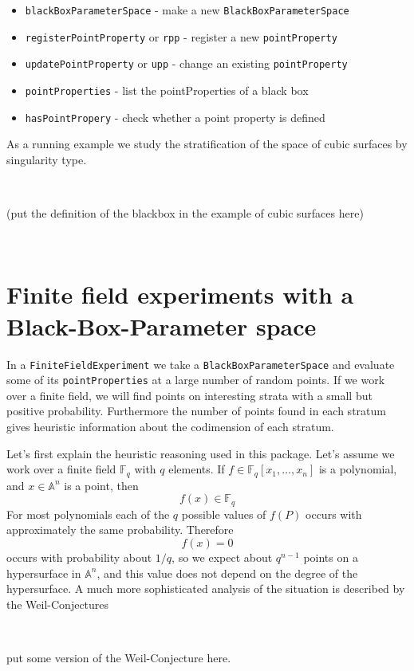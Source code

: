 \documentclass[12pt,a4paper]{amsart}
\theoremstyle{plain}
\theoremstyle{definition}
\newcommand{\FF}{\mathbb F}
\renewcommand{\AA}{\mathbb A}
\begin{document}
\begin{itemize}
\item {\tt blackBoxParameterSpace} - make a new {\tt BlackBoxParameterSpace}
\item {\tt registerPointProperty} or {\tt rpp} - register a new {\tt pointProperty}
\item {\tt updatePointProperty} or {\tt upp} - change an existing {\tt pointProperty}
\item {\tt pointProperties} - list the pointProperties of a black box
\item {\tt hasPointPropery} - check whether a point property is defined
\end{itemize}

As a running example we study the stratification of the space of cubic surfaces by singularity type. 

\

{\color{red} (put the definition of the blackbox in the example of cubic surfaces here)}

\

\section{Finite field experiments with a Black-Box-Parameter space}

In a {\tt FiniteFieldExperiment} we take a {\tt BlackBoxParameterSpace} and evaluate some of its {\tt pointProperties} at a large number of random points. If we work over a finite field, we will find points on interesting strata with a small but positive probability. Furthermore the number of points found in each stratum gives heuristic information about the codimension of each stratum.

Let's first explain the heuristic reasoning used in this package. Let's assume we work over a finite field $\FF_q$ with $q$ elements. If $f \in \FF_q[x_1,\dots,x_n]$ is a polynomial, and $x \in \AA^n$ is a point, then
\[
	f(x) \in \FF_q
\]
For most polynomials each of the $q$ possible values of $f(P)$ occurs with approximately the same probability. Therefore 
\[
	f(x) = 0
\]
occurs with probability about $1/q$, so we expect about $q^{n-1}$ points on a hypersurface in $\AA^n$, and this value does not depend on the degree of the hypersurface. A much more sophisticated analysis of the situation is described by the Weil-Conjectures 

\

{\color{red} put some version of the Weil-Conjecture here.}
\end{document}
